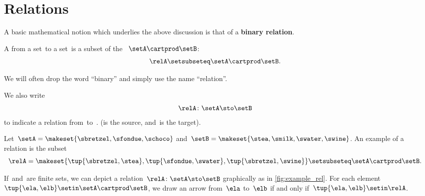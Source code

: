 
\section{Relations}
\label{sec:connection-relations}

A basic mathematical notion which underlies the above discussion is that of a \textbf{binary relation}.

\begin{ctdefinition}
    \label{def:binary-relation}
    A  \relA from a set~\setA to a set~\setB is a subset of the ~$\setA\cartprod \setB$:
    \begin{equation}
        \relA \setsubseteq \setA \cartprod \setB.
    \end{equation}
\end{ctdefinition}

We will often drop the word ``binary'' and simply use the name ``relation''.

We also write
\begin{equation}
    \relA \colon \setA \sto \setB
\end{equation}
to indicate a relation from~\setA to~\setB.
(\setA is the source, and~\setB is the target).

\begin{marginfigure}
    \centering
    \caption{}
    \label{fig:example_rel}
\end{marginfigure}

\begin{example}
    \label{exa:simple-rel}
    Let~$\setA = \makeset{ \sbretzel, \sfondue, \schoco}$ and~$\setB = \makeset{ \stea, \smilk, \swater, \swine }$.
    An example of a relation is the subset
    \begin{equation}
        \relA = \makeset{ \tup{\sbretzel, \stea}, \tup{\sfondue, \swater}, \tup{\sbretzel, \swine} } \setsubseteq \setA \cartprod \setB.
    \end{equation}
\end{example}

If~\setA and~\setB are finite sets, we can depict a relation~$\relA \colon \setA \sto \setB$ graphically as in \cref{fig:example_rel}.
For each element~$\tup{\ela,\elb} \setin \setA \cartprod \setB$, we draw an arrow from~$\ela$ to~$\elb$ if and only if~$\tup{\ela,\elb} \setin \relA$.


